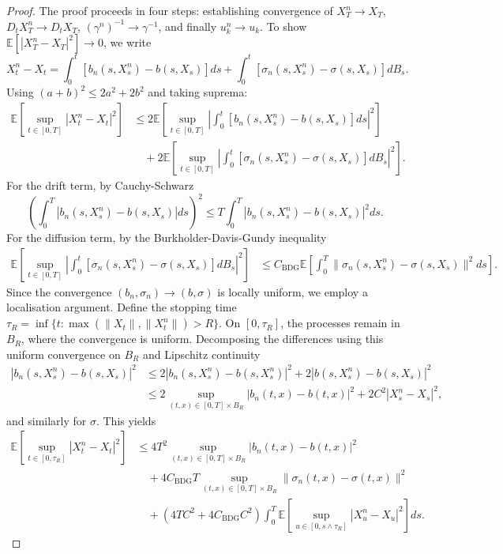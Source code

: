 \documentclass[10pt,a4paper]{amsart}
\begin{document}
\begin{proof}
The proof proceeds in four steps: establishing convergence of \(X_T^n \to X_T\), \(D_t X_T^n \to D_t X_T\), \((\gamma^n)^{-1} \to \gamma^{-1}\), and finally \(u_k^n \to u_k\).
%
To show \(\mathbb{E}[|X_T^n - X_T|^2] \to 0\), we write
\[
X_t^n - X_t = \int_0^t [b_n(s, X_s^n) - b(s, X_s)] ds + \int_0^t [\sigma_n(s, X_s^n) - \sigma(s, X_s)] dB_s.
\]
Using \((a + b)^2 \leq 2a^2 + 2b^2\) and taking suprema:
\begin{align*}
\mathbb{E}\left[\sup_{t \in [0,T]} |X_t^n - X_t|^2\right] &\leq 2\mathbb{E}\left[\sup_{t \in [0,T]} \left|\int_0^t [b_n(s, X_s^n) - b(s, X_s)] ds\right|^2\right] \\
&\quad + 2\mathbb{E}\left[\sup_{t \in [0,T]} \left|\int_0^t [\sigma_n(s, X_s^n) - \sigma(s, X_s)] dB_s\right|^2\right].
\end{align*}
%
For the drift term, by Cauchy-Schwarz
\[
\left(\int_0^T |b_n(s, X_s^n) - b(s, X_s)| ds\right)^2 \leq T \int_0^T |b_n(s, X_s^n) - b(s, X_s)|^2 ds.
\]
For the diffusion term, by the Burkholder-Davis-Gundy inequality
\begin{align*}
\mathbb{E}\left[\sup_{t \in [0,T]} \left|\int_0^t [\sigma_n(s, X_s^n) - \sigma(s, X_s)] dB_s\right|^2\right] &\leq C_{\mathrm{BDG}} \mathbb{E}\left[\int_0^T \|\sigma_n(s, X_s^n) - \sigma(s, X_s)\|^2 ds\right].
\end{align*}
%
Since the convergence \((b_n,\sigma_n)\to(b,\sigma)\) is locally uniform, we employ a localisation argument. Define the stopping time \(\tau_R = \inf\{t : \max(\|X_t\|, \|X_t^n\|) > R\}\). On \([0,\tau_R]\), the processes remain in \(B_R\), where the convergence is uniform. Decomposing the differences using this uniform convergence on \(B_R\) and Lipschitz continuity
\begin{align*}
|b_n(s, X_s^n) - b(s, X_s)|^2 &\leq 2|b_n(s, X_s^n) - b(s, X_s^n)|^2 + 2|b(s, X_s^n) - b(s, X_s)|^2 \\
&\leq 2\sup_{(t,x) \in [0,T] \times B_R} |b_n(t, x) - b(t, x)|^2 + 2C^2|X_s^n - X_s|^2,
\end{align*}
and similarly for \(\sigma\). This yields
\begin{align*}
\mathbb{E}\left[\sup_{t \in [0,\tau_R]} |X_t^n - X_t|^2\right] &\leq 4T^2 \sup_{(t,x) \in [0,T] \times B_R} |b_n(t, x) - b(t, x)|^2 \\
&\quad + 4C_{\mathrm{BDG}}T \sup_{(t,x) \in [0,T] \times B_R} \|\sigma_n(t, x) - \sigma(t, x)\|^2 \\
&\quad + (4TC^2 + 4C_{\mathrm{BDG}}C^2) \int_0^T \mathbb{E}\left[\sup_{u \in [0,s \wedge \tau_R]} |X_u^n - X_u|^2\right] ds.

\end{align*}
\end{proof}
\end{document}
